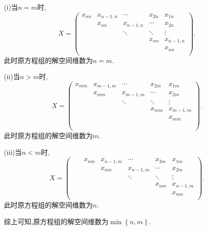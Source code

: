 \documentclass[../../main.tex]{subfiles}
\begin{document}
\begin{solution}
(i)当$n=m$时,
\[
X=\left( \begin{matrix}
x_{nn}&		x_{n-1,n}&		\cdots&		x_{2n}&		x_{1n}\\
&		x_{nn}&		x_{n-1,n}&		\cdots&		x_{2n}\\
&		&		\ddots&		\ddots&		\vdots\\
&		&		&		x_{nn}&		x_{n-1,n}\\
&		&		&		&		x_{nn}\\
\end{matrix} \right) .
\] 
此时原方程组的解空间维数为$n=m$.

(ii)当$n>m$时,
\[
X=\left( \begin{matrix}
x_{mm}&		x_{m-1,m}&		\cdots&		x_{2m}&		x_{1m}\\
&		x_{mm}&		x_{m-1,m}&		\cdots&		x_{2m}\\
&		&		\ddots&		\ddots&		\vdots\\
&		&		&		x_{mm}&		x_{m-1,m}\\
&		&		&		&		x_{mm}\\
&		&		&		&		\\
&		&		&		&		\\
\end{matrix} \right) .
\] 
此时原方程组的解空间维数为$m$.

(iii)当$n<m$时,
\[
X=\left( \begin{matrix}
	&		&		x_{nm}&		x_{n-1,m}&		\cdots&		x_{2m}&		x_{1m}\\
	&		&		&		x_{nm}&		x_{n-1,m}&		\cdots&		x_{2m}\\
	&		&		&		&		\ddots&		\ddots&		\vdots\\
	&		&		&		&		&		x_{nm}&		x_{n-1,m}\\
	&		&		&		&		&		&		x_{nm}\\
\end{matrix} \right) .
\] 
此时原方程组的解空间维数为$n $.

综上可知,原方程组的解空间维数为$\min \left\{ n,m \right\} $.
\end{solution}
\end{document}
